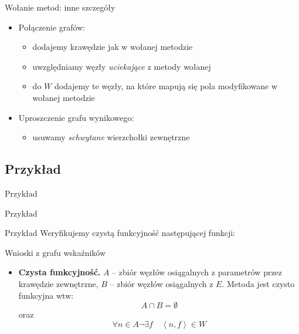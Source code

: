 \documentclass[handout]{beamer}
\begin{document}
\begin{frame}{Wołanie metod: inne szczegóły}
  \begin{itemize}
  \item<1-> Połączenie grafów:
    \begin{itemize}
    \item dodajemy krawędzie jak w wołanej metodzie
    \item uwzględniamy węzły \emph{uciekające} z metody wołanej
    \item do $W$ dodajemy te węzły, na które mapują się pola
      modyfikowane w wołanej metodzie
    \end{itemize}
  \item<2-> Uproszczenie grafu wynikowego:
    \begin{itemize}
    \item usuwamy \emph{schwytane} wierzchołki zewnętrzne
    \end{itemize}
  \end{itemize}
\end{frame}

\subsection{Przykład}

\begin{frame}{Przykład}
  \small{
    
  }
\end{frame}

\begin{frame}{Przykład}
  \small{
    
  }
\end{frame}

\begin{frame}{Przykład}
  Weryfikujemy czystą funkcyjność następującej funkcji: 
  
\end{frame}

\begin{frame}{Wnioski z grafu wskaźników}
  \begin{itemize}
    \item \textbf{Czysta funkcyjność.}
      $A$ -- zbiór węzłów osiągalnych z parametrów przez krawędzie zewnętrzne, 
      $B$ -- zbiór węzłów osiągalnych z $E$. 
      Metoda jest czysto funkcyjna wtw:
      $$A \cap B = \emptyset$$
      oraz 
      $$\forall n \in A \neg\exists f \quad \left<n,f\right>\in W$$
  \end{itemize}
\end{frame}
\end{document}
